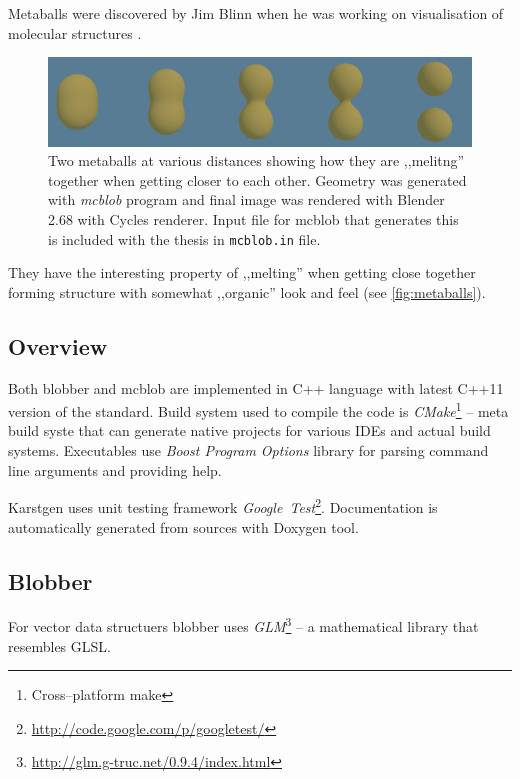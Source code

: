 Metaballs were discovered by Jim Blinn when he was working on visualisation of
molecular structures \parencite{Blinn:1982:GAS:357306.357310}.
\label{sub:metaballs}
\begin{figure}[htb]
  \begin{center}
    \includegraphics[width=\textwidth]{chapters/project/metaballs.png}
  \end{center}
  \caption{Two metaballs at various distances showing how they are ,,melitng''
    together when getting closer to each other. Geometry was generated with
    \emph{mcblob} program and final image was rendered with Blender 2.68 with
    Cycles renderer. Input file for mcblob that generates this is included with the thesis
      in \texttt{mcblob.in} file.
  }
  \label{fig:metaballs}
\end{figure}

They have the interesting property of ,,melting'' when getting close together
forming structure with somewhat ,,organic'' look and feel (see \autoref{fig:metaballs}).

\subsection{Overview}
Both blobber and mcblob are implemented in C++ language with latest C++11
version of the standard. Build system used to compile the code is \emph{CMake}\footnote{Cross--platform make}
-- meta build syste that can generate native projects for various IDEs and
actual build systems.
Executables use \emph{Boost Program Options} library for parsing command line
arguments and providing help.

Karstgen uses unit testing framework \emph{Google~Test}\footnote{\url{http://code.google.com/p/googletest/}}.
Documentation is automatically generated from sources with Doxygen
tool.


\subsection{Blobber}

For vector data structuers blobber uses \emph{GLM}\footnote{\url{http://glm.g-truc.net/0.9.4/index.html}}
-- a mathematical library that resembles GLSL.

